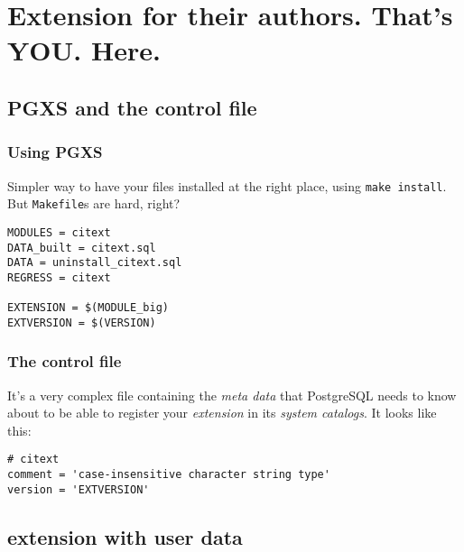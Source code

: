 \documentclass[english]{beamer}
\begin{document}
\section{Extension for their authors. That's YOU. Here.}

\subsection{PGXS and the control file}

\begin{frame}[fragile]
  \frametitle{Using PGXS}

  Simpler way to have your files installed at the right place, using
  \texttt{make install}. But \texttt{Makefile}s are hard, right?

  \begin{example}
\begin{verbatim}
MODULES = citext
DATA_built = citext.sql
DATA = uninstall_citext.sql
REGRESS = citext

EXTENSION = $(MODULE_big)
EXTVERSION = $(VERSION)
\end{verbatim}
  \end{example}
\end{frame}


\begin{frame}[fragile]
  \frametitle{The control file}

  It's a very complex file containing the \textit{meta data} that PostgreSQL
  needs to know about to be able to register your \textit{extension} in its
  \textit{system catalogs}. It looks like this:

  \begin{example}
\begin{verbatim}
# citext
comment = 'case-insensitive character string type'
version = 'EXTVERSION'
\end{verbatim}
  \end{example}
\end{frame}


\subsection{extension with user data}
\end{document}
